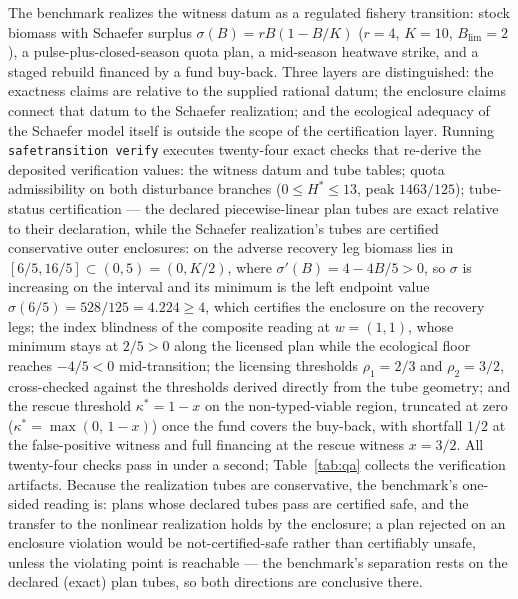 \documentclass[3p,11pt]{elsarticle}
\begin{document}
The benchmark realizes the witness datum as a regulated fishery transition:
stock biomass with Schaefer surplus $\sigma(B) = rB(1 - B/K)$ ($r = 4$,
$K = 10$, $B_{\mathrm{lim}} = 2$), a pulse-plus-closed-season quota plan,
a mid-season heatwave strike, and a staged rebuild financed by a fund
buy-back. Three layers are distinguished: the exactness claims are
relative to the supplied rational datum; the enclosure claims connect
that datum to the Schaefer realization; and the ecological adequacy of
the Schaefer model itself is outside the scope of the certification
layer. Running \texttt{safetransition verify} executes twenty-four exact
checks that re-derive the deposited verification values: the witness datum
and tube tables; quota admissibility on both disturbance branches
($0 \leq H^* \leq 13$, peak $1463/125$); tube-status certification --- the
declared piecewise-linear plan tubes are exact relative to their
declaration, while the Schaefer realization's tubes are certified
conservative outer enclosures: on the adverse recovery leg biomass lies
in $[6/5, 16/5] \subset (0, 5) = (0, K/2)$, where
$\sigma'(B) = 4 - 4B/5 > 0$, so $\sigma$ is increasing on the interval
and its minimum is the left endpoint value $\sigma(6/5) = 528/125 = 4.224
\geq 4$, which certifies the enclosure on the recovery legs; the
index blindness of the composite reading at $w = (1, 1)$, whose minimum
stays at $2/5 > 0$ along the licensed plan while the ecological floor
reaches $-4/5 < 0$ mid-transition; the licensing thresholds
$\rho_1 = 2/3$ and $\rho_2 = 3/2$, cross-checked against the thresholds
derived directly from the tube geometry; and the rescue threshold
$\kappa^* = 1 - x$ on the non-typed-viable region, truncated at zero
($\kappa^* = \max(0,\, 1-x)$) once the fund covers the buy-back, with
shortfall $1/2$ at the false-positive witness and full financing at the
rescue witness $x = 3/2$. All twenty-four checks pass in under a second;
Table~\ref{tab:qa} collects the verification artifacts. Because the
realization tubes are conservative, the benchmark's one-sided reading is:
plans whose declared tubes pass are certified safe, and the transfer to
the nonlinear realization holds by the enclosure; a plan rejected on an
enclosure violation would be not-certified-safe rather than certifiably
unsafe, unless the violating point is reachable --- the benchmark's
separation rests on the declared (exact) plan tubes, so both directions
are conclusive there.
\end{document}
